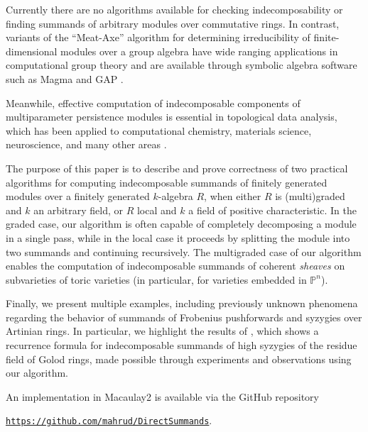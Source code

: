 \documentclass[12pt]{article}
\def\PP{\mathbb P}
\theoremstyle{theorem}
\numberwithin{thm}{section}
\theoremstyle{definition}
\begin{document}
Currently there are no algorithms available for checking indecomposability or finding summands of arbitrary modules over commutative rings. In contrast, variants of the ``Meat-Axe'' algorithm for determining irreducibility of finite-dimensional modules over a group algebra have wide ranging applications in computational group theory \cite{Parker84,HR94,Holt98} and are available through symbolic algebra software such as Magma and GAP \cite{MAGMA,GAP}.

Meanwhile, effective computation of indecomposable components of multiparameter persistence modules is essential in topological data analysis, which has been applied to computational chemistry, materials science, neuroscience, and many other areas \cite{BL23}.

The purpose of this paper is to describe and prove correctness of two practical algorithms for computing indecomposable summands of finitely generated modules over a finitely generated $k$-algebra $R$, when either $R$ is (multi)graded and $k$ an arbitrary field, or $R$ local and $k$ a field of positive characteristic.
In the graded case, our algorithm is often capable of completely decomposing a module in a single pass, while in the local case it proceeds by splitting the module into two summands and continuing recursively.
The multigraded case of our algorithm enables the computation of indecomposable summands of coherent \emph{sheaves} on subvarieties of toric varieties (in particular, for varieties embedded in $\PP^n$).

Finally, we present multiple examples, including  previously unknown phenomena regarding the behavior of summands of Frobenius pushforwards and syzygies over Artinian rings. In particular, we highlight the results of \cite{CDE24}, which shows a recurrence formula for indecomposable summands of high syzygies of the residue field of Golod rings, made possible through experiments and observations using our algorithm.

An implementation in Macaulay2 \cite{M2} is available via the GitHub repository \\
\centerline{
  \href{https://github.com/mahrud/DirectSummands}
       {\texttt{https://github.com/mahrud/DirectSummands}}.}

\end{document}
